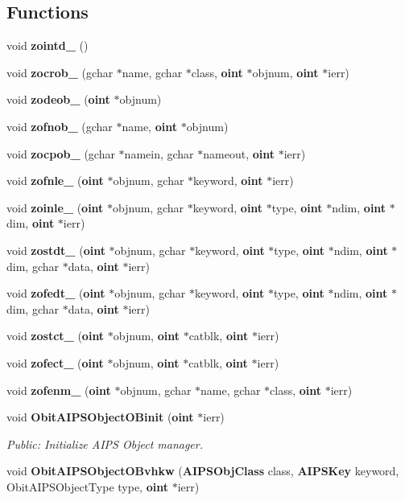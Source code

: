 \subsection*{Functions}
\begin{CompactItemize}
\item 
void {\bf zointd\_\-} ()
\item 
void {\bf zocrob\_\-} (gchar $\ast$name, gchar $\ast$class, {\bf oint} $\ast$objnum, {\bf oint} $\ast$ierr)
\item 
void {\bf zodeob\_\-} ({\bf oint} $\ast$objnum)
\item 
void {\bf zofnob\_\-} (gchar $\ast$name, {\bf oint} $\ast$objnum)
\item 
void {\bf zocpob\_\-} (gchar $\ast$namein, gchar $\ast$nameout, {\bf oint} $\ast$ierr)
\item 
void {\bf zofnle\_\-} ({\bf oint} $\ast$objnum, gchar $\ast$keyword, {\bf oint} $\ast$ierr)
\item 
void {\bf zoinle\_\-} ({\bf oint} $\ast$objnum, gchar $\ast$keyword, {\bf oint} $\ast$type, {\bf oint} $\ast$ndim, {\bf oint} $\ast$dim, {\bf oint} $\ast$ierr)
\item 
void {\bf zostdt\_\-} ({\bf oint} $\ast$objnum, gchar $\ast$keyword, {\bf oint} $\ast$type, {\bf oint} $\ast$ndim, {\bf oint} $\ast$dim, gchar $\ast$data, {\bf oint} $\ast$ierr)
\item 
void {\bf zofedt\_\-} ({\bf oint} $\ast$objnum, gchar $\ast$keyword, {\bf oint} $\ast$type, {\bf oint} $\ast$ndim, {\bf oint} $\ast$dim, gchar $\ast$data, {\bf oint} $\ast$ierr)
\item 
void {\bf zostct\_\-} ({\bf oint} $\ast$objnum, {\bf oint} $\ast$catblk, {\bf oint} $\ast$ierr)
\item 
void {\bf zofect\_\-} ({\bf oint} $\ast$objnum, {\bf oint} $\ast$catblk, {\bf oint} $\ast$ierr)
\item 
void {\bf zofenm\_\-} ({\bf oint} $\ast$objnum, gchar $\ast$name, gchar $\ast$class, {\bf oint} $\ast$ierr)
\item 
void {\bf Obit\-AIPSObject\-OBinit} ({\bf oint} $\ast$ierr)
\begin{CompactList}\small\item\em Public: Initialize AIPS Object manager. \item\end{CompactList}\item 
void {\bf Obit\-AIPSObject\-OBvhkw} ({\bf AIPSObj\-Class} class, {\bf AIPSKey} keyword, Obit\-AIPSObject\-Type type, {\bf oint} $\ast$ierr)

\end{CompactItemize}
